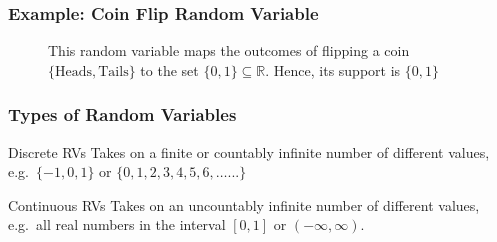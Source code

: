 \begin{frame}
\frametitle{Example: Coin Flip Random Variable}

\begin{figure}
\centering
{}
\caption{This random variable maps the outcomes of flipping a coin $\{\mbox{Heads}, \mbox{Tails}\}$ to the set $\{0,1\}\subseteq \mathbb{R}$. Hence, its support is $\{0,1\}$}
\end{figure}
\end{frame}
\begin{frame}
\frametitle{Types of Random Variables}
 
	\begin{block}{Discrete RVs}
	Takes on a finite or countably infinite number of different values, e.g.\  $\{-1, 0, 1\}$ or $\{0, 1, 2, 3, 4, 5, 6, \hdots ...\}$
	\end{block}
 	
	\begin{block}{Continuous RVs}
	Takes on an uncountably infinite number of different values, e.g.\ all real numbers in the interval $[0,1]$ or $(-\infty, \infty)$.
	\end{block}

\end{frame}


